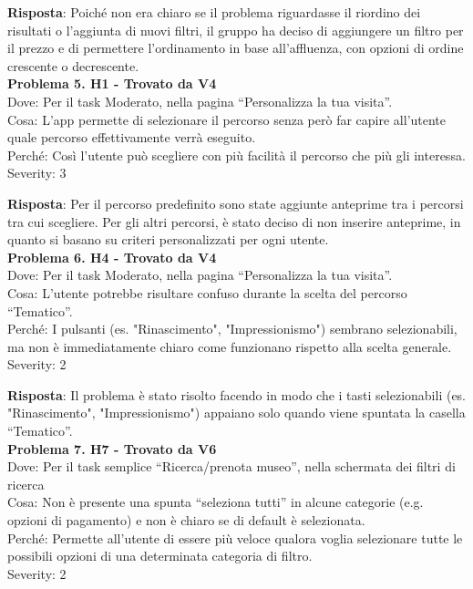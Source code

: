 \documentclass{article}
\begin{document}
\noindent \textbf{Risposta}: Poiché non era chiaro se il problema riguardasse il riordino dei risultati o l’aggiunta di nuovi filtri, il gruppo ha deciso di aggiungere un filtro per il prezzo e di permettere l'ordinamento in base all’affluenza, con opzioni di ordine crescente o decrescente.\\

\noindent \textbf{Problema 5. H1 - Trovato da V4} \\
Dove: Per il task Moderato, nella pagina “Personalizza la tua visita”. \\
Cosa: L'app permette di selezionare il percorso senza però far capire all’utente quale percorso effettivamente verrà eseguito. \\
Perché: Così l’utente può scegliere con più facilità il percorso che più gli interessa. \\
Severity: 3

\noindent \textbf{Risposta}: Per il percorso predefinito sono state aggiunte anteprime tra i percorsi tra cui scegliere. Per gli altri percorsi, è stato deciso di non inserire anteprime, in quanto si basano su criteri personalizzati per ogni utente.\\

\noindent \textbf{Problema 6. H4 - Trovato da V4} \\
Dove: Per il task Moderato, nella pagina “Personalizza la tua visita”. \\
Cosa: L’utente potrebbe risultare confuso durante la scelta del percorso “Tematico”. \\
Perché: I pulsanti (es. "Rinascimento", "Impressionismo") sembrano selezionabili, ma non è immediatamente chiaro come funzionano rispetto alla scelta generale. \\
Severity: 2

\noindent \textbf{Risposta}: Il problema è stato risolto facendo in modo che i tasti selezionabili (es. "Rinascimento", "Impressionismo") appaiano solo quando viene spuntata la casella “Tematico”.\\

\noindent \textbf{Problema 7. H7 - Trovato da V6} \\
Dove: Per il task semplice “Ricerca/prenota museo”, nella schermata dei filtri di ricerca \\
Cosa: Non è presente una spunta “seleziona tutti” in alcune categorie (e.g. opzioni di pagamento) e non è chiaro se di default è selezionata. \\
Perché: Permette all’utente di essere più veloce qualora voglia selezionare tutte le possibili opzioni di una determinata categoria di filtro. \\
Severity: 2
\end{document}
